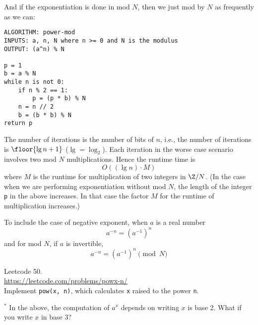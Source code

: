 And if the exponentiation is done in mod $N$, then we just
mod by $N$ as frequently as we can:
\begin{Verbatim}[frame=single,fontsize=\footnotesize]
ALGORITHM: power-mod
INPUTS: a, n, N where n >= 0 and N is the modulus
OUTPUT: (a^n) % N

p = 1
b = a % N
while n is not 0:
    if n % 2 == 1:
        p = (p * b) % N
    n = n // 2 
    b = (b * b) % N
return p    
\end{Verbatim}

The number of iterations is the number of bits of $n$, i.e.,
the number of iterations is $\floor{\lg n + 1}$ ($\lg = \log_2$).
Each iteration in the worse case scenario involves
two mod $N$ multiplications.
Hence the runtime time is
\[
O((\lg n) \cdot M)
\]
where $M$ is the runtime for multiplication of two integers in $\Z/N$.
(In the case when we are performing exponentiation without mod $N$,
the length of the integer \verb!p! in the above increases.
In that case the factor $M$ for the runtime of multiplication increases.)


To include the case of negative exponent, when $a$ is a real number
\[
a^{-n} = (a^{-1})^n
\]
and for mod $N$, if $a$ is invertible,
\[
a^{-n} = (a^{-1})^n \pmod{N}
\]

\begin{ex}
  Leetcode 50.\\
  \url{https://leetcode.com/problems/powx-n/}\\
  Implement \verb!pow(x, n)!,
  which calculates \verb!x! raised to the power
  \verb!n!.
\end{ex}


\begin{ex}$^*$
  In the above, the computation of $a^x$ depends on writing $x$ is base 2.
  What if you write $x$ in base 3?
\end{ex}
